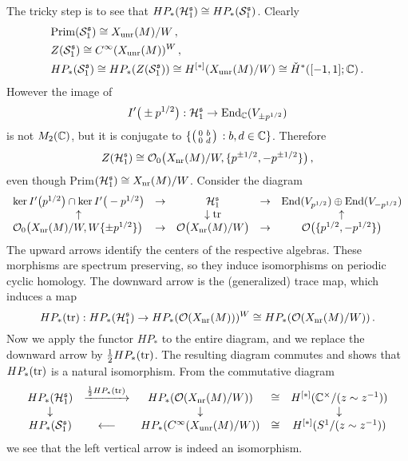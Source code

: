 The tricky step is to see that $HP_* (\mathcal H_1^{\mathfrak s}) \cong 
HP_* (\mathcal S_1^{\mathfrak s})$. Clearly
\begin{align*}
& \mathrm{Prim}(\mathcal S_1^{\mathfrak s}) \cong X_{\mathrm{unr}} (M) /W \,, \\
& Z (\mathcal S_1^{\mathfrak s}) \cong  C^\infty (X_{\mathrm{unr}} (M))^W \,,\\
& HP_* (\mathcal S_1^{\mathfrak s}) \cong HP_* (Z(\mathcal S_1^{\mathfrak s})) \cong
H^{[*]}( X_{\mathrm{unr}} (M) / W) \cong \check H^* ([-1,1] ; \mathbb C) \,.
\end{align*}
However the image of 
\[
I' \big( \pm p^{1/2} \big) : \mathcal H_1^{\mathfrak s} \to \mathrm{End}_{\mathbb C} ( V_{\pm p^{1/2}} )
\]
is not $M_2 (\mathbb C )$, but it is conjugate to 
$\{ \left(\begin{smallmatrix} 0 & b \\ 0 & d \end{smallmatrix}\right) \,: b,d \in \mathbb C \}$. Therefore 
\[
Z (\mathcal H_1^{\mathfrak s}) \cong \mathcal O_0 \big(X_{\mathrm{nr}} (M) / W , 
\{ p^{\pm 1/2} ,-p^{\pm 1/2} \} \big) \,,
\]
even though Prim$ (\mathcal H_1^{\mathfrak s}) \cong X_{\mathrm{nr}} (M) / W$. 
Consider the diagram
\[
\begin{array}{ccccc}
\ker I' \big( p^{1/2} \big) \cap \ker I' \big( -p^{1/2} \big) & \to & \mathcal H_1^{\mathfrak s} & 
\to & \mathrm{End} ( V_{p^{1/2}}) \oplus \mathrm{End} (V_{-p^{1/2}} ) \\
\uparrow & & \downarrow \mathrm{tr} & & \uparrow \\
\! \mathcal O_0 \big(X_{\mathrm{nr}} (M) / W , W \{ \pm p^{1/2} \} \big) & \to &
\mathcal O \big(X_{\mathrm{nr}} (M) / W \big) & \to & \mathcal O \big( \{ p^{1/2} ,-p^{1/2} \} \big) 
\end{array}
\]
The upward arrows identify the centers of the respective algebras. These
morphisms are spectrum preserving, so they induce isomorphisms on
periodic cyclic homology. The downward arrow is the (generalized) trace map, 
which induces a map
\[
HP_* (\mathrm{tr}) : HP_* (\mathcal H_1^{\mathfrak s}) \to HP_* (\mathcal O (X_{\mathrm{nr}} (M) ) )^W
\cong HP_* (\mathcal O (X_{\mathrm{nr}} (M)/W)) \,.
\]
Now we apply the functor $HP_*$ to the entire diagram, and we replace the
downward arrow by $\frac{1}{2} HP_* (\mathrm {tr})$. The resulting diagram 
commutes and shows that $HP_* (\mathrm{tr})$ is a natural isomorphism.
From the commutative diagram 
\[
\begin{array}{ccccc}
HP_* (\mathcal H_1^{\mathfrak s}) & \xrightarrow{\frac{1}{2} HP_* (\mathrm{tr})} & 
HP_* (\mathcal O (X_{\mathrm{nr}} (M) / W )) & \cong & H^{[*]} (\mathbb C^\times / (z \sim z^{-1})) \\
\downarrow & & \downarrow & & \downarrow \\
HP_* (\mathcal S_1^{\mathfrak s}) & \longleftarrow & HP_* (C^\infty (X_{\mathrm{unr}} (M)/W )) &
\cong & H^{[*]} (S^1 / (z \sim z^{-1} ))
\end{array}
\]
we see that the left vertical arrow is indeed an isomorphism.
